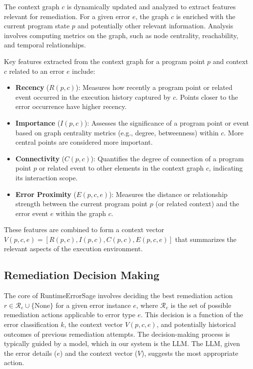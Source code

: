 The context graph $c$ is dynamically updated and analyzed to extract features relevant for remediation. For a given error $e$, the graph $c$ is enriched with the current program state $p$ and potentially other relevant information. Analysis involves computing metrics on the graph, such as node centrality, reachability, and temporal relationships.

Key features extracted from the context graph for a program point $p$ and context $c$ related to an error $e$ include:
\begin{itemize}[leftmargin=*,align=left]
    \item \textbf{Recency} ($R(p, c)$): Measures how recently a program point or related event occurred in the execution history captured by $c$. Points closer to the error occurrence have higher recency.
    \item \textbf{Importance} ($I(p, c)$): Assesses the significance of a program point or event based on graph centrality metrics (e.g., degree, betweenness) within $c$. More central points are considered more important.\cite{graph_centrality_metrics_2015}
    \item \textbf{Connectivity} ($C(p, c)$): Quantifies the degree of connection of a program point $p$ or related event to other elements in the context graph $c$, indicating its interaction scope.
    \item \textbf{Error Proximity} ($E(p, c, e)$): Measures the distance or relationship strength between the current program point $p$ (or related context) and the error event $e$ within the graph $c$.
\end{itemize}
These features are combined to form a context vector $V(p, c, e) = [R(p, c), I(p, c), C(p, c), E(p, c, e)]$ that summarizes the relevant aspects of the execution environment.

\subsection{Remediation Decision Making}

The core of RuntimeErrorSage involves deciding the best remediation action $r \in \mathcal{R}_e \cup \{\text{None}\}$ for a given error instance $e$, where $\mathcal{R}_e$ is the set of possible remediation actions applicable to error type $e$. This decision is a function of the error classification $k$, the context vector $V(p, c, e)$, and potentially historical outcomes of previous remediation attempts. The decision-making process is typically guided by a model, which in our system is the LLM. The LLM, given the error details ($e$) and the context vector ($V$), suggests the most appropriate action.

